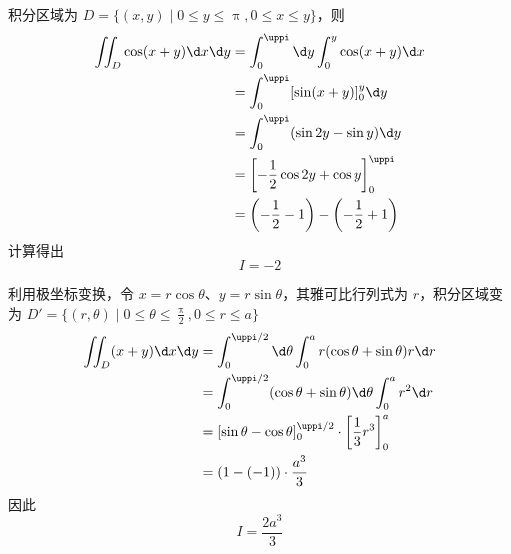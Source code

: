 \begin{solution}

    积分区域为 $D = \{ (x, y) \mid 0 \le y \le \uppi, 0 \le x \le y \}$，则
    \begin{equation}
        \begin{aligned}
            \iint_{D} \cos (x+y) \d x \d y & = \int_{0}^{\uppi} \d y \int_{0}^{y} \cos (x+y) \d x                \\
                                           & = \int_{0}^{\uppi} [\sin(x+y)]_{0}^{y} \d y                         \\
                                           & = \int_{0}^{\uppi} (\sin 2y - \sin y) \d y                          \\
                                           & = \left[ -\frac{1}{2} \cos 2y + \cos y \right]_{0}^{\uppi}          \\
                                           & = \left( -\frac{1}{2} - 1 \right) - \left( -\frac{1}{2} + 1 \right)
        \end{aligned}
    \end{equation}
    计算得出
    \begin{equation}
        I = \boxed{-2}
    \end{equation}


    利用极坐标变换，令 $x = r \cos \theta$、$y = r \sin \theta$，其雅可比行列式为 $r$，积分区域变为 $D' = \{ (r, \theta) \mid 0 \le \theta \le \frac{\uppi}{2}, 0 \le r \le a \}$
    \begin{equation}
        \begin{aligned}
            \iint_{D} (x+y) \d x \d y & = \int_{0}^{\uppi/2} \d \theta \int_{0}^{a} r (\cos \theta + \sin \theta) r \d r           \\
                                      & = \int_{0}^{\uppi/2} (\cos \theta + \sin \theta) \d \theta \int_{0}^{a} r^{2} \d r         \\
                                      & = [\sin \theta - \cos \theta]_{0}^{\uppi/2} \cdot \left[ \frac{1}{3} r^{3} \right]_{0}^{a} \\
                                      & = (1 - (-1)) \cdot \frac{a^{3}}{3}
        \end{aligned}
    \end{equation}
    因此
    \begin{equation}
        I = \boxed{\frac{2 a^{3}}{3}}
    \end{equation}



\end{solution}
